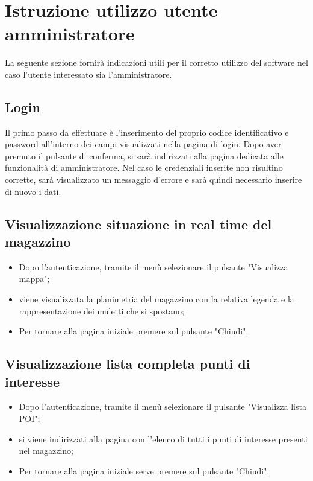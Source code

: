 \section{Istruzione utilizzo utente amministratore}

La seguente sezione fornirà indicazioni utili per il corretto utilizzo del software nel caso l'utente interessato sia l'amministratore.

\subsection{Login}
Il primo passo da effettuare è l'inserimento del proprio codice identificativo e password all'interno dei campi visualizzati nella pagina di login. Dopo aver premuto il pulsante di conferma, si sarà indirizzati alla pagina dedicata alle funzionalità di amministratore. Nel caso le credenziali inserite non risultino corrette, sarà visualizzato un messaggio d'errore e sarà quindi necessario inserire di nuovo i dati.

\subsection{Visualizzazione situazione in real time del magazzino}
\begin{itemize}
    \item Dopo l'autenticazione, tramite il menù selezionare il pulsante "Visualizza mappa";
    \item viene visualizzata la planimetria del magazzino con la relativa legenda e la rappresentazione dei muletti che si spostano;
    \item Per tornare alla pagina iniziale premere sul pulsante "Chiudi".
\end{itemize}
\subsection{Visualizzazione lista completa punti di interesse}
\begin{itemize}
    \item Dopo l'autenticazione, tramite il menù selezionare il pulsante "Visualizza lista POI";
    \item si viene indirizzati alla pagina con l'elenco di tutti i punti di interesse presenti nel magazzino;
    \item Per tornare alla pagina iniziale serve premere sul pulsante "Chiudi".
\end{itemize}
